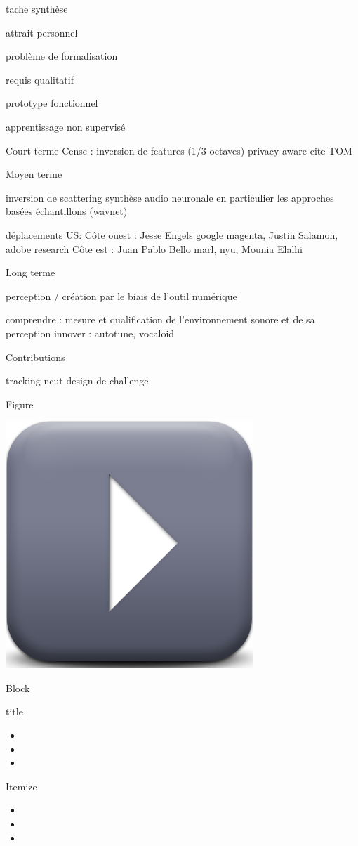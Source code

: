 
tache synthèse

attrait personnel


problème de formalisation

requis qualitatif

prototype fonctionnel

apprentissage non supervisé

Court terme
Cense : inversion de features (1/3 octaves) privacy aware cite
TOM

Moyen terme

inversion de scattering
synthèse audio neuronale
en particulier les approches basées échantillons (wavnet)

déplacements US:
    Côte ouest : Jesse Engels google magenta, Justin Salamon, adobe research
    Côte est : Juan Pablo Bello marl, nyu, Mounia Elalhi 

Long terme

perception / création par le biais de l'outil numérique

comprendre : mesure et qualification de l'environnement sonore et de sa perception
innover : autotune, vocaloid

Contributions

tracking
ncut
design de challenge

\begin{frame}{Figure}
\begin{center}
\includegraphics[width=.6\columnwidth]{figures/play} \\
\end{center}
\end{frame}

\begin{frame}{Block}
\begin{block}{title}
\begin{itemize}
\item
\item
\item
\end{itemize}
\end{block}
\end{frame}


\begin{frame}{Itemize}
\begin{itemize}
\item
\item
\item
\end{itemize}
\end{frame}